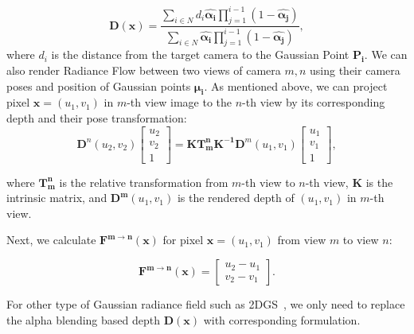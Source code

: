 \begin{equation}
    \bm{D}(\bm{x}) = \frac{\sum_{i \in N} d_i 
    \bm{\hat{\alpha_i}} \prod_{j=1}^{i-1} (1-\bm{\hat{\alpha_j}})}{\sum_{i \in N}\bm{\hat{\alpha_i}} \prod_{j=1}^{i-1} (1-\bm{\hat{\alpha_j}})} ,
\end{equation}
where $d_i$ is the distance from the target camera to the Gaussian Point $\bm{P_i}$.
%
We can also render Radiance Flow between two views of camera $m, n$ using
their camera poses and position of Gaussian points $\bm{\mu_i}$.
%
As mentioned above, we can project pixel $\bm{x} = (u_1, v_1)$ in $m$-th view image
to the $n$-th view by its corresponding depth and their pose transformation:
\begin{equation}
    \bm{D}^n(u_2 , v_2)
    \begin{bmatrix}
     u_2\\
     v_2\\
     1
    \end{bmatrix}
    = 
    \bm{K}\bm{T_{m}^{n}}\bm{K^{-1}}\bm{D}^m(u_1 , v_1)
    \begin{bmatrix}
     u_1\\
     v_1\\
     1
    \end{bmatrix},
    \label{equ:flow_pose}
\end{equation}

where $\bm{T_{m}^{n}}$ is the relative transformation from $m$-th view to $n$-th view, 
$\bm{K}$ is the intrinsic matrix, and $\bm{D^m}(u_1, v_1)$ is the rendered depth of $(u_1, v_1)$ in $m$-th view.

%
Next, we calculate $\bm{F^{m\rightarrow n}}(\bm{x})$ for pixel $\bm{x} = (u_1, v_1)$ from view $m$ to view $n$:

\begin{equation}
    \bm{F^{m\rightarrow n}}(\bm{x}) = 
    \begin{bmatrix}
     u_2 - u_1\\
     v_2 - v_1
    \end{bmatrix}. 
    \label{equ:flow}
\end{equation}

%
For other type of Gaussian radiance field such as 2DGS~\citep{huang20242d}, 
we only need to replace the alpha blending based depth $\bm{D}(\bm{x})$ with
corresponding formulation.

